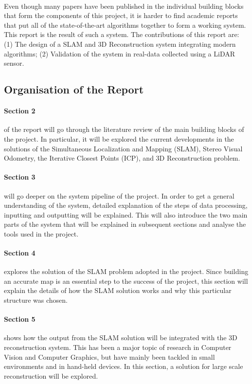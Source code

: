 \documentclass[12pt]{article}
\begin{document}
	\paragraph{}
	Even though many papers have been published in the individual building blocks that form the components of this project, it is harder to find academic reports that put all of the state-of-the-art algorithms together to form a working system. This report is the result of such a system. The contributions of this report are: (1) The design of a SLAM and 3D Reconstruction system integrating modern algorithms; (2) Validation of the system in real-data collected using a LiDAR sensor.
	
	\subsection{ Organisation of the Report}
		\paragraph{Section 2} of the report will go through the literature review of the main building blocks of the project. In particular, it will be explored the current developments in the solutions of the Simultaneous Localization and Mapping (SLAM), Stereo Visual Odometry, the Iterative Closest Points (ICP), and 3D Reconstruction problem.
		
		\paragraph{Section 3} will go deeper on the system pipeline of the project. In order to get a general understanding of the system, detailed explanation of the steps of data processing, inputting and outputting will be explained. This will also introduce the two main parts of the system that will be explained in subsequent sections and analyse the tools used in the project.
		
		\paragraph{Section 4} explores the solution of the SLAM problem adopted in the project. Since building an accurate map is an essential step to the success of the project, this section will explain the details of how the SLAM solution works and why this particular structure was chosen.
		
		\paragraph{Section 5} shows how the output from the SLAM solution will be integrated with the 3D reconstruction system. This has been a major topic of research in Computer Vision and Computer Graphics, but have mainly been tackled in small environments and in hand-held devices. In this section, a solution for large scale reconstruction will be explored.
		
\end{document}
